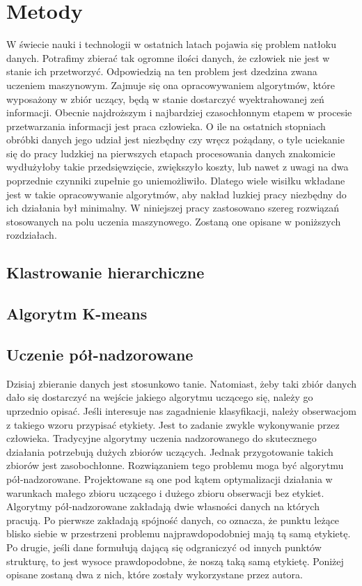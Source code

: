 \documentclass{article}
\begin{document}
\section{Metody}
W świecie nauki i technologii w ostatnich latach pojawia się problem natłoku danych.
Potrafimy zbierać tak ogromne ilości danych, że człowiek nie jest w stanie ich przetworzyć.
Odpowiedzią na ten problem jest dzedzina zwana uczeniem maszynowym. 
Zajmuje się ona opracowywaniem algorytmów, które wyposażony w zbiór uczący, będą w stanie dostarczyć wyektrahowanej zeń informacji.
Obecnie najdroższym i najbardziej czasochłonnym etapem w procesie przetwarzania informacji jest praca człowieka.
O ile na ostatnich stopniach obróbki danych jego udział jest niezbędny czy wręcz pożądany, o tyle uciekanie się do pracy ludzkiej na pierwszych etapach procesowania danych znakomicie wydłużyłoby takie przedsięwzięcie, zwiększyło koszty, lub nawet z uwagi na dwa poprzednie czynniki zupełnie go uniemożliwiło.
Dlatego wiele wisiłku wkładane jest w takie opracowywanie algorytmów, aby nakład luzkiej pracy niezbędny do ich działania był minimalny.
W niniejszej pracy zastosowano szereg rozwiązań stosowanych na polu uczenia maszynowego.
Zostaną one opisane w poniższych rozdziałach.
\subsection{Klastrowanie hierarchiczne}

\subsection{Algorytm K-means}
\subsection{Uczenie pół-nadzorowane}
Dzisiaj zbieranie danych jest stosunkowo tanie.
Natomiast, żeby taki zbiór danych dało się dostarczyć na wejście jakiego algorytmu uczącego się, należy go uprzednio opisać.
Jeśli interesuje nas zagadnienie klasyfikacji, należy obserwacjom z takiego wzoru przypisać etykiety.
Jest to zadanie zwykle wykonywanie przez człowieka.
Tradycyjne algorytmy uczenia nadzorowanego do skutecznego działania potrzebują dużych zbiorów uczących. 
Jednak przygotowanie takich zbiorów jest zasobochłonne.
Rozwiązaniem tego problemu moga być algorytmu pół-nadzorowane.
Projektowane są one pod kątem optymalizacji działania w warunkach małego zbioru uczącego i dużego zbioru obserwacji bez etykiet.
Algorytmy pół-nadzorowane zakładają dwie własności danych na których pracują.
Po pierwsze zakładają spójność danych, co oznacza, że punktu leżące blisko siebie w przestrzeni problemu najprawdopodobniej mają tą samą etykietę.
Po drugie, jeśli dane formułują dającą się odgraniczyć od innych punktów strukturę, to jest wysoce prawdopodobne, że noszą taką samą etykietę\cite{Zhou2004}.
Poniżej opisane zostaną dwa z nich, które zostały wykorzystane przez autora.
\end{document}
